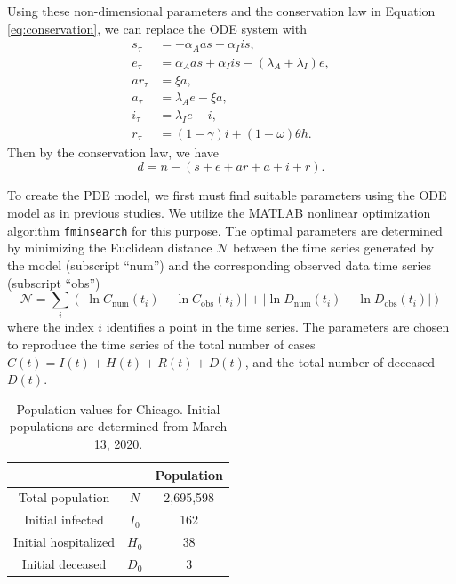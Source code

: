 \documentclass[11pt]{article}
\begin{document}
	Using these non-dimensional parameters and the conservation law in Equation \ref{eq:conservation}, we can replace the ODE system with
	\begin{align}
		\label{eq:s_t}
		s_\tau &= - \alpha_A a s - \alpha_I i s, \\
		\label{eq:e_t}
		e_\tau &= \alpha_A a s + \alpha_I i s - (\lambda_A + \lambda_I) e, \\
		\label{eq:ar_t}
		ar_\tau &= \xi a, \\
		\label{eq:a_t}
		a_\tau &= \lambda_A e - \xi a, \\
		\label{eq:i_t}
		i_\tau &= \lambda_I e - i, \\
		\label{eq:r_t}
		r_\tau &= (1 - \gamma) i + (1 - \omega) \theta h.
	\end{align}
	Then by the conservation law, we have
	\begin{equation} \label{eq:d_t}
		d = n - (s + e + ar + a + i + r).
	\end{equation}
	
	To create the PDE model, we first must find suitable parameters using the ODE model as in previous studies.
	We utilize the MATLAB nonlinear optimization algorithm \verb|fminsearch| for this purpose.
	The optimal parameters are determined by minimizing the Euclidean distance $\mathcal{N}$ between the time series generated by the model (subscript ``num'') and the corresponding observed data time series (subscript ``obs'')
	\begin{equation} \label{eq:objfun}
		\mathcal{N} = \sum_i \left( \left| \ln C_\mathrm{num} (t_i) - \ln C_\mathrm{obs} (t_i) \right| + \left| \ln D_\mathrm{num} (t_i) - \ln D_\mathrm{obs} (t_i) \right| \right)
	\end{equation}
	where the index $i$ identifies a point in the time series.
	The parameters are chosen to reproduce the time series of the total number of cases $C(t) = I(t) + H(t) + R(t) + D(t)$, and the total number of deceased $D(t)$.
	
	\begin{table}[h]
		\centering
		\caption{Population values for Chicago.
			Initial populations are determined from March 13, 2020.}
		\label{tab:populations}
		\begin{tabular}{ c c c }
			\hline
			\hline
			&	&	Population \\
			\hline
			Total population		&	$N$		&	2,695,598 \\
			Initial infected		&	$I_0$	&	162	\\
			Initial hospitalized	&	$H_0$	&	38 \\
			Initial deceased		&	$D_0$	&	3 \\
			\hline
			\hline
		\end{tabular}
	\end{table}
\end{document}

